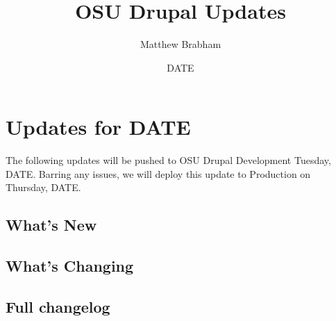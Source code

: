 
\title{OSU Drupal Updates}
\author{Matthew Brabham}
\date{DATE}

    \maketitle
    \tableofcontents

    \section{Updates for DATE}
    The following updates will be pushed to OSU Drupal Development Tuesday, DATE.
    Barring any issues, we will deploy this update to Production on Thursday, DATE.

    \subsection{What's New}\label{subsec:what's-new}

    \subsection{What's Changing}\label{subsec:what's-chaning}

    \subsection{Full changelog}\label{subsec:full-changelog}


